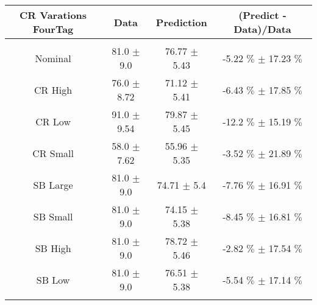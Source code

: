 \begin{footnotesize} 
\begin{tabular}{c|c|c|c} 
CR Varations FourTag & Data & Prediction & (Predict - Data)/Data \\ 
\hline\hline 
& & & \\ 
Nominal & 81.0 $\pm$ 9.0 & 76.77 $\pm$ 5.43 & -5.22 $\%$  $\pm$ 17.23 $\%$ \\ 
\hline 
CR High & 76.0 $\pm$ 8.72 & 71.12 $\pm$ 5.41 & -6.43 $\%$  $\pm$ 17.85 $\%$ \\ 
\hline 
CR Low & 91.0 $\pm$ 9.54 & 79.87 $\pm$ 5.45 & -12.2 $\%$  $\pm$ 15.19 $\%$ \\ 
\hline 
CR Small & 58.0 $\pm$ 7.62 & 55.96 $\pm$ 5.35 & -3.52 $\%$  $\pm$ 21.89 $\%$ \\ 
\hline 
SB Large & 81.0 $\pm$ 9.0 & 74.71 $\pm$ 5.4 & -7.76 $\%$  $\pm$ 16.91 $\%$ \\ 
\hline 
SB Small & 81.0 $\pm$ 9.0 & 74.15 $\pm$ 5.38 & -8.45 $\%$  $\pm$ 16.81 $\%$ \\ 
\hline 
SB High & 81.0 $\pm$ 9.0 & 78.72 $\pm$ 5.46 & -2.82 $\%$  $\pm$ 17.54 $\%$ \\ 
\hline 
SB Low & 81.0 $\pm$ 9.0 & 76.51 $\pm$ 5.38 & -5.54 $\%$  $\pm$ 17.14 $\%$ \\ 
& & & \\ 
\hline\hline 
\end{tabular} 
\end{footnotesize} 
\newline 
